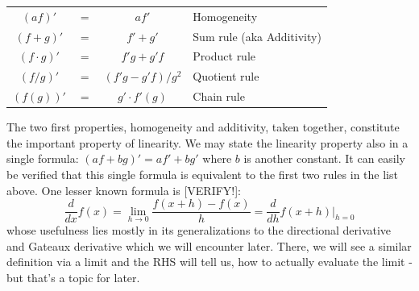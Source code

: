 \medskip
\begin{tabular}{c c c l}
  $(a f)'$        &$=$& $ a f'$              & Homogeneity \\
  $(f + g)'$      &$=$& $f' + g'$            & Sum rule (aka Additivity) \\
  $(f \cdot g)'$  &$=$& $f' g + g' f$        & Product rule \\
  $(f / g)'$      &$=$& $(f' g - g' f)/g^2$  & Quotient rule \\
  $(f( g))'$      &$=$& $g' \cdot f'(g)$     & Chain rule \\
\end{tabular}
\medskip





The two first properties, homogeneity and additivity, taken together, constitute the important property of linearity. We may state the linearity property also in a single formula: $(a f + b g)' = a f' + b g'$ where $b$ is another constant. It can easily be verified that this single formula is equivalent to the first two rules in the list above. One lesser known formula is [VERIFY!]:
\begin{equation}
\label{Eq:DerivativeViaH}
 \frac{d}{d x} f(x) 
 = \lim_{h \rightarrow 0} \frac{f(x + h) - f(x)}{h}
 = \frac{d}{d h} f(x + h) \bigg\rvert_{h=0}
\end{equation}
whose usefulness lies mostly in its generalizations to the directional derivative and Gateaux derivative which we will encounter later. There, we will see a similar definition via a limit and the RHS will tell us, how to actually evaluate the limit - but that's a topic for later. 

